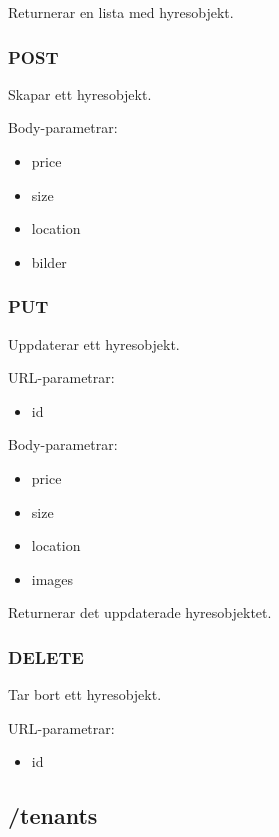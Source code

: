 \documentclass{article}
\begin{document}
Returnerar en lista med hyresobjekt.

\subsubsection {POST}
\label{ssub:POST}

Skapar ett hyresobjekt.

Body-parametrar:

\begin{itemize}
    \item price
    \item size
    \item location
    \item bilder
\end{itemize}

\subsubsection {PUT}
\label{ssub:PUT}

Uppdaterar ett hyresobjekt.

URL-parametrar:

\begin{itemize}
    \item id
\end{itemize}

Body-parametrar:

\begin{itemize}
    \item price
    \item size
    \item location
    \item images 
\end{itemize}

Returnerar det uppdaterade hyresobjektet.

\subsubsection {DELETE}
\label{ssub:DELETE}

Tar bort ett hyresobjekt.

URL-parametrar:

\begin{itemize}
    \item id
\end{itemize}

\subsection {/tenants}
\label{sub:/tenants}
\end{document}
